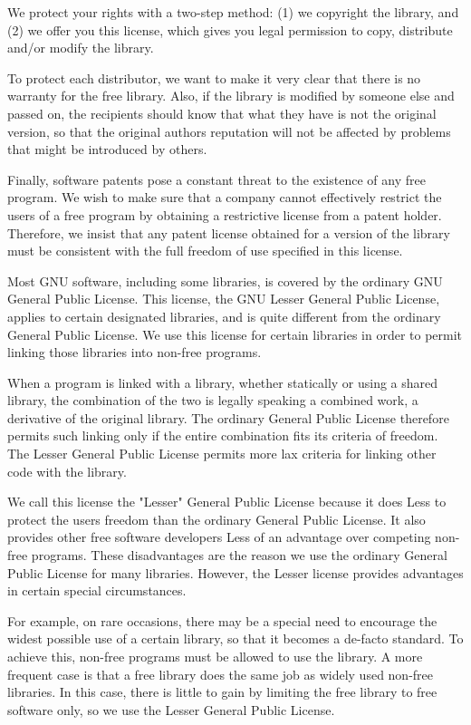 We protect your rights with a two-\/step method\+: (1) we copyright the library, and (2) we offer you this license, which gives you legal permission to copy, distribute and/or modify the library.

To protect each distributor, we want to make it very clear that there is no warranty for the free library. Also, if the library is modified by someone else and passed on, the recipients should know that what they have is not the original version, so that the original author\textquotesingle{}s reputation will not be affected by problems that might be introduced by others.

Finally, software patents pose a constant threat to the existence of any free program. We wish to make sure that a company cannot effectively restrict the users of a free program by obtaining a restrictive license from a patent holder. Therefore, we insist that any patent license obtained for a version of the library must be consistent with the full freedom of use specified in this license.

Most GNU software, including some libraries, is covered by the ordinary GNU General Public License. This license, the GNU Lesser General Public License, applies to certain designated libraries, and is quite different from the ordinary General Public License. We use this license for certain libraries in order to permit linking those libraries into non-\/free programs.

When a program is linked with a library, whether statically or using a shared library, the combination of the two is legally speaking a combined work, a derivative of the original library. The ordinary General Public License therefore permits such linking only if the entire combination fits its criteria of freedom. The Lesser General Public License permits more lax criteria for linking other code with the library.

We call this license the "{}\+Lesser"{} General Public License because it does Less to protect the user\textquotesingle{}s freedom than the ordinary General Public License. It also provides other free software developers Less of an advantage over competing non-\/free programs. These disadvantages are the reason we use the ordinary General Public License for many libraries. However, the Lesser license provides advantages in certain special circumstances.

For example, on rare occasions, there may be a special need to encourage the widest possible use of a certain library, so that it becomes a de-\/facto standard. To achieve this, non-\/free programs must be allowed to use the library. A more frequent case is that a free library does the same job as widely used non-\/free libraries. In this case, there is little to gain by limiting the free library to free software only, so we use the Lesser General Public License.

